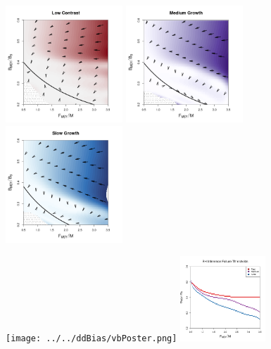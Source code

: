 \documentclass[ xcolor = pdftex, dvipsnames, table ]{beamer}
\begin{document}
%
\begin{frame}
	\includegraphics[width=0.33\textwidth]{../../ddBias/directionalBiasDDSubFlatT45N150A0-1AS0.1K10N56Reds 2.png}
        \includegraphics[width=0.33\textwidth]{../../ddBias/directionalBiasDDSubFlatT45N150A0-1AS1K0.5N56Purples.png}
        \includegraphics[width=0.33\textwidth]{../../ddBias/directionalBiasDDSubFlatT45N150A0-1AS2K0.1N84EdgeBlues.png}
\end{frame}

%
\begin{frame}
	\texttt{[image: ../../ddBias/vbPoster.png]}
	\includegraphics[width=0.24\textwidth]{../../ddBias/relErrorImagesBHDD0.5.png}
\end{frame}
\end{document}
